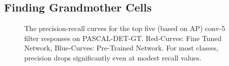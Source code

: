 \subsection{Finding Grandmother Cells}
\label{sub:class-specific-unit}


\begin{figure}[t!]
\centering
{}
\caption{The precision-recall curves for the top five (based on AP) conv-5 filter responses on PASCAL-DET-GT. Red-Curves: Fine Tuned Network, Blue-Curves: Pre-Trained Network. For most classes, precision drops significantly even at modest recall values. }
\label{fig:ap}
\end{figure}


